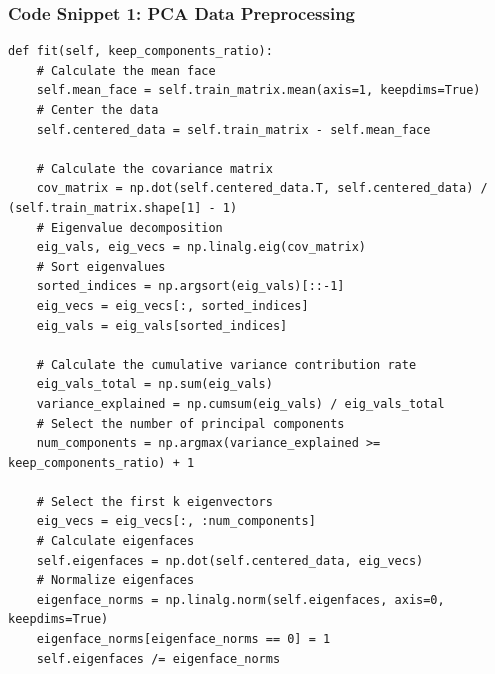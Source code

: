 \documentclass{article}
\begin{document}
\subsubsection{Code Snippet 1: PCA Data Preprocessing}
\begin{lstlisting}[basicstyle=\scriptsize\ttfamily, linewidth=\textwidth]
def fit(self, keep_components_ratio):
    # Calculate the mean face
    self.mean_face = self.train_matrix.mean(axis=1, keepdims=True)
    # Center the data
    self.centered_data = self.train_matrix - self.mean_face

    # Calculate the covariance matrix
    cov_matrix = np.dot(self.centered_data.T, self.centered_data) / (self.train_matrix.shape[1] - 1)
    # Eigenvalue decomposition
    eig_vals, eig_vecs = np.linalg.eig(cov_matrix)
    # Sort eigenvalues
    sorted_indices = np.argsort(eig_vals)[::-1]
    eig_vecs = eig_vecs[:, sorted_indices]
    eig_vals = eig_vals[sorted_indices]

    # Calculate the cumulative variance contribution rate
    eig_vals_total = np.sum(eig_vals)
    variance_explained = np.cumsum(eig_vals) / eig_vals_total
    # Select the number of principal components
    num_components = np.argmax(variance_explained >= keep_components_ratio) + 1

    # Select the first k eigenvectors
    eig_vecs = eig_vecs[:, :num_components]
    # Calculate eigenfaces
    self.eigenfaces = np.dot(self.centered_data, eig_vecs)
    # Normalize eigenfaces
    eigenface_norms = np.linalg.norm(self.eigenfaces, axis=0, keepdims=True)
    eigenface_norms[eigenface_norms == 0] = 1
    self.eigenfaces /= eigenface_norms
\end{lstlisting}
\end{document}

